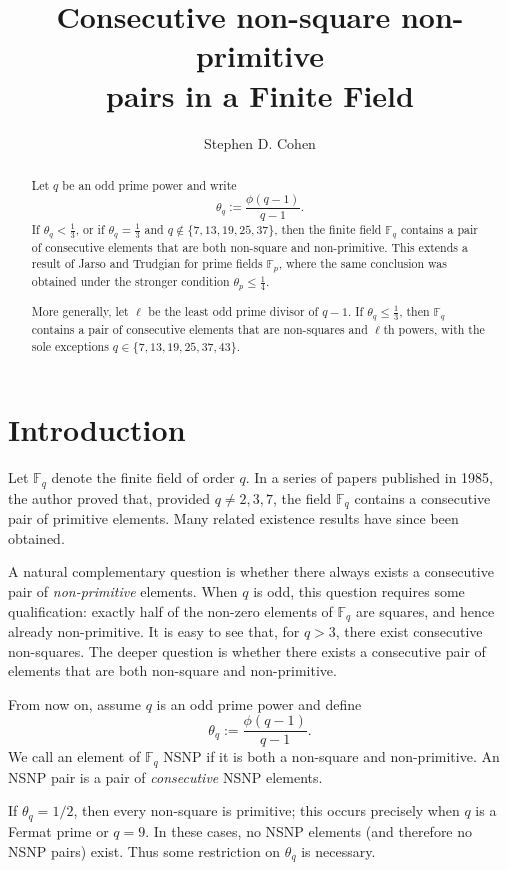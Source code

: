 \documentclass[12pt]{amsart}
\title[Non-square non-primitive pairs] {Consecutive non-square non-primitive \\pairs in a Finite Field}
\author{Stephen D. Cohen}
\date{}
\numberwithin{equation}{section}
\newcommand{\F}{\mathbb{F}_q}
\newcommand{\Fp}{\mathbb{F}_p}
\begin{document}
\maketitle

\begin{abstract}
Let $q$ be an odd prime power and write
\[
\theta_q := \frac{\phi(q-1)}{q-1}.
\]
If $\theta_q < \tfrac{1}{3}$, or if $\theta_q = \tfrac{1}{3}$ and 
$q \notin \{7,13,19,25,37\}$, then the finite field $\F$ contains a pair of consecutive elements that are both non-square and non-primitive. This extends a result of Jarso and Trudgian for prime fields $\Fp$, where the same conclusion was obtained under the stronger condition $\theta_p \le \tfrac{1}{4}$.

More generally, let $\ell$ be the least odd prime divisor of $q-1$. If $\theta_q \le \tfrac{1}{3}$, then $\F$ contains a pair of consecutive elements that are non-squares and $\ell$th powers, with the sole exceptions 
$q \in \{7,13,19,25,37,43\}$.
\end{abstract}



\section{Introduction}


Let $\F$ denote the finite field of order $q$. In a series of papers published in 1985, the author \cite{Coh1985a, Coh1985b, Coh1985} proved that, provided $q\neq 2,3,7$, the field $\F$ contains a consecutive pair of primitive elements. Many related existence results have since been obtained.

A natural complementary question is whether there always exists a consecutive pair of \emph{non-primitive} elements. When $q$ is odd, this question requires some qualification: exactly half of the non-zero elements of $\F$ are squares, and hence already non-primitive. It is easy to see that, for $q>3$, there exist consecutive non-squares. The deeper question is whether there exists a consecutive pair of elements that are both non-square and non-primitive.

From now on, assume $q$ is an odd prime power and define
\[
\theta_q := \frac{\phi(q-1)}{q-1}.
\] 
We call an element of $\F$ NSNP if it is both a non-square and non-primitive. An  NSNP pair is a pair of {\em consecutive} NSNP elements. 

If $\theta_q=1/2$, then every non-square is primitive; this occurs precisely when $q$ is a Fermat prime or $q=9$.  In these cases, no NSNP elements (and therefore no NSNP pairs) exist. Thus some restriction on $\theta_q$ is necessary.
\end{document}
